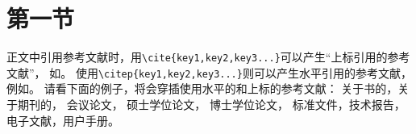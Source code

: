 \documentclass[twoside]{article}
\begin{document}
    \section*{第一节}


正文中引用参考文献时，用\verb+\cite{key1,key2,key3...}+可以产生“上标引用的参考文献”，
如\cite{Meta_CN,chen2007act,DPMG}。
使用\verb+\citep{key1,key2,key3...}+则可以产生水平引用的参考文献，
例如\citep{JohnD,zhubajie,IEEE-1363}。
请看下面的例子，将会穿插使用水平的和上标的参考文献：
关于书的\citep{Meta_CN,JohnD,IEEE-1363}，关于期刊的\cite{chen2007act,chen2007ewi}，
会议论文\citep{DPMG,kocher99,cnproceed}，
硕士学位论文\citep{zhubajie,metamori2004}，
博士学位论文\cite{shaheshang,FistSystem01,bai2008}，
标准文件\citep{IEEE-1363}，技术报告\cite{NPB2}，电子文献\citep{xiaoyu2001, CHRISTINE1998}，用户手册\citep{RManual}。


  
    

    
\end{document}

